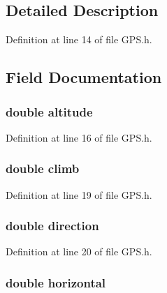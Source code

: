 \subsection{Detailed Description}


Definition at line 14 of file G\-P\-S.\-h.



\subsection{Field Documentation}
\hypertarget{struct__location_a2b13d276aee0d9fd646c8fa3647e869b}{
\subsubsection[{altitude}]{\setlength{\rightskip}{0pt plus 5cm}double altitude}}\label{struct__location_a2b13d276aee0d9fd646c8fa3647e869b}


Definition at line 16 of file G\-P\-S.\-h.

\hypertarget{struct__location_a72cbc74638e72ebd02fc3b0bd2cb80af}{
\subsubsection[{climb}]{\setlength{\rightskip}{0pt plus 5cm}double climb}}\label{struct__location_a72cbc74638e72ebd02fc3b0bd2cb80af}


Definition at line 19 of file G\-P\-S.\-h.

\hypertarget{struct__location_a8da9718bd3d0396135453cbb12751a5b}{
\subsubsection[{direction}]{\setlength{\rightskip}{0pt plus 5cm}double direction}}\label{struct__location_a8da9718bd3d0396135453cbb12751a5b}


Definition at line 20 of file G\-P\-S.\-h.

\hypertarget{struct__location_aababb3cab13d0b7706c591b114d9ef9a}{
\subsubsection[{horizontal}]{\setlength{\rightskip}{0pt plus 5cm}double horizontal}}\label{struct__location_aababb3cab13d0b7706c591b114d9ef9a}



